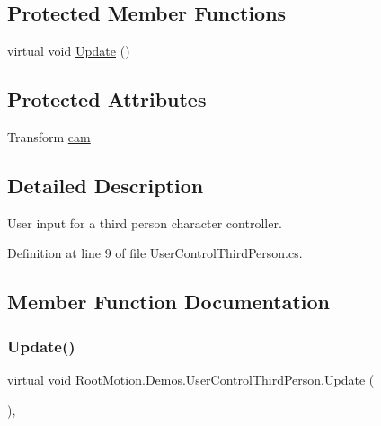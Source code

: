 \subsection*{Protected Member Functions}
\begin{DoxyCompactItemize}
\item 
virtual void \mbox{\hyperlink{class_root_motion_1_1_demos_1_1_user_control_third_person_ac429f5624f918df39ba614e1f6a73ddc}{Update}} ()
\end{DoxyCompactItemize}
\subsection*{Protected Attributes}
\begin{DoxyCompactItemize}
\item 
Transform \mbox{\hyperlink{class_root_motion_1_1_demos_1_1_user_control_third_person_ab42ab476cc3caa5240e9c0b51b5ea09f}{cam}}
\end{DoxyCompactItemize}


\subsection{Detailed Description}
User input for a third person character controller. 



Definition at line 9 of file User\+Control\+Third\+Person.\+cs.



\subsection{Member Function Documentation}
\mbox{\label{class_root_motion_1_1_demos_1_1_user_control_third_person_ac429f5624f918df39ba614e1f6a73ddc}} 
\subsubsection{\texorpdfstring{Update()}{Update()}}
{\footnotesize\ttfamily virtual void Root\+Motion.\+Demos.\+User\+Control\+Third\+Person.\+Update (\begin{DoxyParamCaption}{ }\end{DoxyParamCaption})\hspace{0.3cm}{\ttfamily [protected]}, {\ttfamily [virtual]}}



